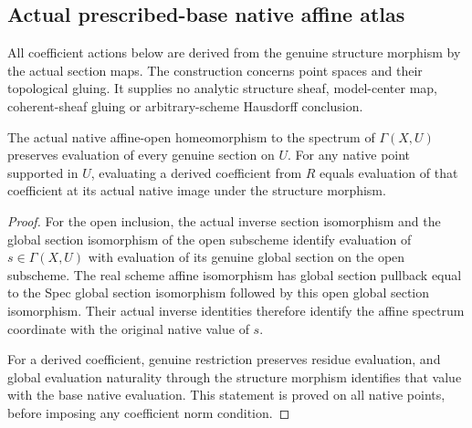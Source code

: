 \subsection{Actual prescribed-base native affine atlas}
\label{subsec:relative-native-atlas}

All coefficient actions below are derived from the genuine structure morphism
by the actual section maps. The construction concerns point spaces and their
topological gluing. It supplies no analytic structure sheaf, model-center map,
coherent-sheaf gluing or arbitrary-scheme Hausdorff conclusion.

\begin{theorem}
\label{scheme:affine-chart-section-values}
\leanok
{}
The actual native affine-open homeomorphism to the spectrum of $\Gamma(X,U)$
preserves evaluation of every genuine section on $U$. For any native point
supported in $U$, evaluating a derived coefficient from $R$ equals evaluation
of that coefficient at its actual native image under the structure morphism.
\end{theorem}
\begin{proof}
For the open inclusion, the actual inverse section isomorphism and the global
section isomorphism of the open subscheme identify evaluation of $s\in\Gamma(X,U)$
with evaluation of its genuine global section on the open subscheme. The real
scheme affine isomorphism has global section pullback equal to the Spec global
section isomorphism followed by this open global section isomorphism. Their
actual inverse identities therefore identify the affine spectrum coordinate
with the original native value of $s$.

For a derived coefficient, genuine restriction preserves residue evaluation,
and global evaluation naturality through the structure morphism identifies
that value with the base native evaluation. This statement is proved on all
native points, before imposing any coefficient norm condition.
\end{proof}

